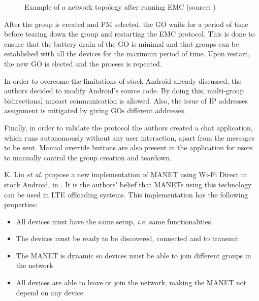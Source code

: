 \begin{figure}[ht]
	\noindent{}
	\caption{\label{fig:emc} Example of a network topology after running EMC (source: \cite{emc})}
\end{figure}

After the group is created and \gls{PM} selected, the \gls{GO} waits for a period of time before tearing down the group and restarting the EMC protocol. This is done to ensure that the battery drain of the \gls{GO} is minimal and that groups can be established with all the devices for the maximum period of time. Upon restart, the new \gls{GO} is elected and the process is repeated.

In order to overcome the limitations of stock Android already discussed, the authors decided to modify Android's source code. By doing this, multi-group bidirectional unicast communication is allowed. Also, the issue of \gls{IP} addresses assignment is mitigated by giving \glspl{GO} different addresses.

Finally, in order to validate the protocol the authors created a chat application, which runs autonomously without any user interaction, apart from the messages to be sent. Manual override buttons are also present in the application for users to manually control the group creation and teardown.\newline

K. Liu \textit{et al.} propose a new implementation of \gls{MANET}
using Wi-Fi Direct in stock Android, in \cite{manet}. It is the authors' belief that \glspl{MANET} using this technology can be used in \gls{LTE} offloading systems. This implementation has the following properties:

\begin{itemize}
\item All devices must have the same setup, \textit{i.e.} same functionalities.
\item The devices must be ready to be discovered, connected and to transmit
\item The \gls{MANET} is dynamic so devices must be able to join different groups in the network
\item All devices are able to leave or join the network, making the \gls{MANET} not depend on any device
\end{itemize}

